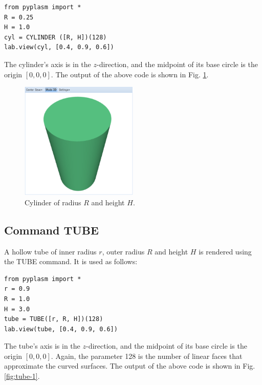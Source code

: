 \documentclass[article,A4,12pt]{llncs}
\begin{document}
\begin{verbatim}
from pyplasm import *
R = 0.25
H = 1.0
cyl = CYLINDER ([R, H])(128)
lab.view(cyl, [0.4, 0.9, 0.6])
\end{verbatim}
The cylinder's axis is in the $z$-direction, and the midpoint of
its base circle is the origin $[0, 0, 0]$. 
The output of the above code is shown in Fig. \ref{fig:cyl-1}.

\begin{figure}[!ht]
\begin{center}
\includegraphics[width=0.5\textwidth]{img/cyl-1.png}
\end{center}
\vspace{-2mm}
\caption{Cylinder of radius $R$ and height $H$.}
\label{fig:cyl-1}
\end{figure}

\subsection{Command TUBE}

A hollow tube of inner radius $r$, outer radius $R$ and height
$H$ is rendered using the TUBE command. It is used as follows:
\begin{verbatim}
from pyplasm import *
r = 0.9
R = 1.0
H = 3.0
tube = TUBE([r, R, H])(128)
lab.view(tube, [0.4, 0.9, 0.6])
\end{verbatim}
The tube's axis is in the $z$-direction, and the midpoint of
its base circle is the origin $[0, 0, 0]$. Again, the parameter
128 is the number of linear faces that approximate the 
curved surfaces. The output of the above code is shown in Fig. \ref{fig:tube-1}.

\newpage
\end{document}
